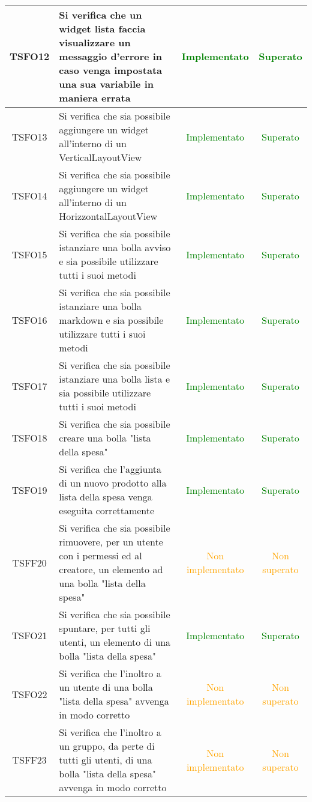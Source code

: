 \begin{center}
\begin{longtable}{|c|>{\centering}m{10cm}|c|c|}
		TSFO12 & Si verifica che un widget lista faccia visualizzare un messaggio d'errore in caso venga impostata una sua variabile in maniera errata & \textcolor{Green}{Implementato} & \textcolor{Green}{Superato} \\ \hline
		TSFO13 & Si verifica che sia possibile aggiungere un widget all'interno di un VerticalLayoutView & \textcolor{Green}{Implementato} & \textcolor{Green}{Superato} \\ \hline
		TSFO14 & Si verifica che sia possibile aggiungere un widget all'interno di un HorizzontalLayoutView & \textcolor{Green}{Implementato} & \textcolor{Green}{Superato} \\ \hline
		TSFO15 & Si verifica che sia possibile istanziare una bolla avviso e sia possibile utilizzare tutti i suoi metodi & \textcolor{Green}{Implementato} & \textcolor{Green}{Superato} \\ \hline
		TSFO16 & Si verifica che sia possibile istanziare una bolla markdown e sia possibile utilizzare tutti i suoi metodi & \textcolor{Green}{Implementato} & \textcolor{Green}{Superato} \\ \hline
		TSFO17 & Si verifica che sia possibile istanziare una bolla lista e sia possibile utilizzare tutti i suoi metodi & \textcolor{Green}{Implementato} & \textcolor{Green}{Superato} \\ \hline
		TSFO18 & Si verifica che sia possibile creare una bolla "lista della spesa" & \textcolor{Green}{Implementato} & \textcolor{Green}{Superato} \\ \hline
		TSFO19 & Si verifica che l'aggiunta di un nuovo prodotto alla lista della spesa venga eseguita correttamente & \textcolor{Green}{Implementato} & \textcolor{Green}{Superato} \\ \hline
		TSFF20 & Si verifica che sia possibile rimuovere, per un utente con i permessi ed al creatore, un elemento ad una bolla "lista della spesa" & \textcolor{Orange}{Non implementato} & \textcolor{Orange}{Non superato} \\ \hline
		TSFO21 & Si verifica che sia possibile spuntare, per tutti gli utenti, un elemento di una bolla "lista della spesa" & \textcolor{Green}{Implementato} & \textcolor{Green}{Superato} \\ \hline
		TSFO22 & Si verifica che l'inoltro a un utente di una bolla "lista della spesa" avvenga in modo corretto & \textcolor{Orange}{Non implementato} & \textcolor{Orange}{Non superato} \\ \hline
		TSFF23 & Si verifica che l'inoltro a un gruppo, da perte di tutti gli utenti, di una bolla "lista della spesa" avvenga in modo corretto & \textcolor{Orange}{Non implementato} & \textcolor{Orange}{Non superato} \\ \hline

\end{longtable}
\end{center}

